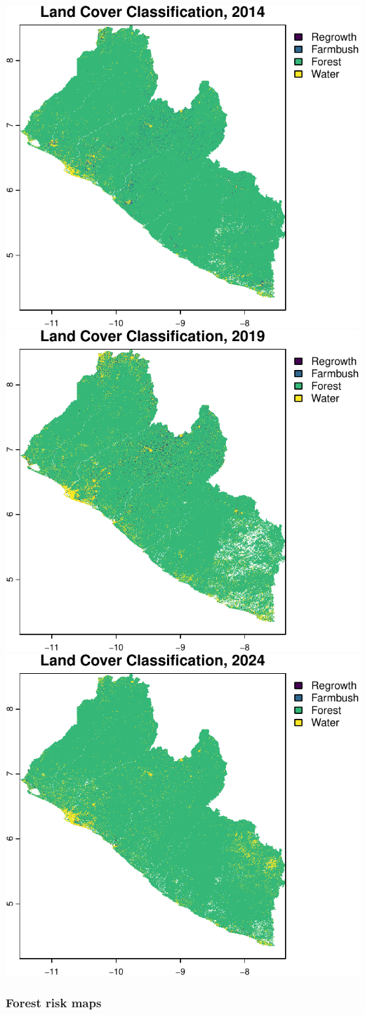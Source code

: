 \documentclass[
]{article}
\begin{document}
\includegraphics[width=0.33\linewidth]{rspb-gola-redd-review_files/figure-latex/unnamed-chunk-19-1}
\includegraphics[width=0.33\linewidth]{rspb-gola-redd-review_files/figure-latex/unnamed-chunk-19-2}
\includegraphics[width=0.33\linewidth]{rspb-gola-redd-review_files/figure-latex/unnamed-chunk-19-3}

\subsubsection{Forest risk maps}\label{forest-risk-maps}
\end{document}

